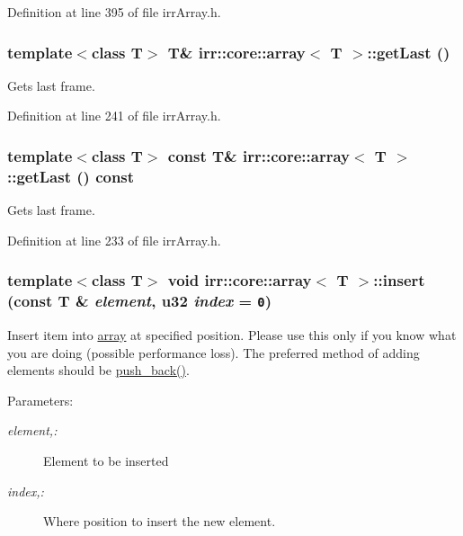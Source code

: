 Definition at line 395 of file irrArray.h.\hypertarget{classirr_1_1core_1_1array_142e1833faabec2b7578557fd12e72c2}{
\subsubsection[{getLast}]{\setlength{\rightskip}{0pt plus 5cm}template$<$class T$>$ T\& {\bf irr::core::array}$<$ T $>$::getLast ()}}
\label{classirr_1_1core_1_1array_142e1833faabec2b7578557fd12e72c2}


Gets last frame. 



Definition at line 241 of file irrArray.h.\hypertarget{classirr_1_1core_1_1array_5424fdabc6ad12f503a15b2c4d7f6b0e}{
\subsubsection[{getLast}]{\setlength{\rightskip}{0pt plus 5cm}template$<$class T$>$ const T\& {\bf irr::core::array}$<$ T $>$::getLast () const}}
\label{classirr_1_1core_1_1array_5424fdabc6ad12f503a15b2c4d7f6b0e}


Gets last frame. 



Definition at line 233 of file irrArray.h.\hypertarget{classirr_1_1core_1_1array_7dd91405226e52db0c5a26add9f8e106}{
\subsubsection[{insert}]{\setlength{\rightskip}{0pt plus 5cm}template$<$class T$>$ void {\bf irr::core::array}$<$ T $>$::insert (const T \& {\em element}, \/  {\bf u32} {\em index} = {\tt 0})}}
\label{classirr_1_1core_1_1array_7dd91405226e52db0c5a26add9f8e106}


Insert item into \hyperlink{classirr_1_1core_1_1array}{array} at specified position. Please use this only if you know what you are doing (possible performance loss). The preferred method of adding elements should be \hyperlink{classirr_1_1core_1_1array_95afc36513d08abb51bd399755730877}{push\_\-back()}. \begin{Desc}
\item[Parameters:]
\begin{description}
\item[{\em element,:}]Element to be inserted \item[{\em index,:}]Where position to insert the new element. \end{description}
\end{Desc}


